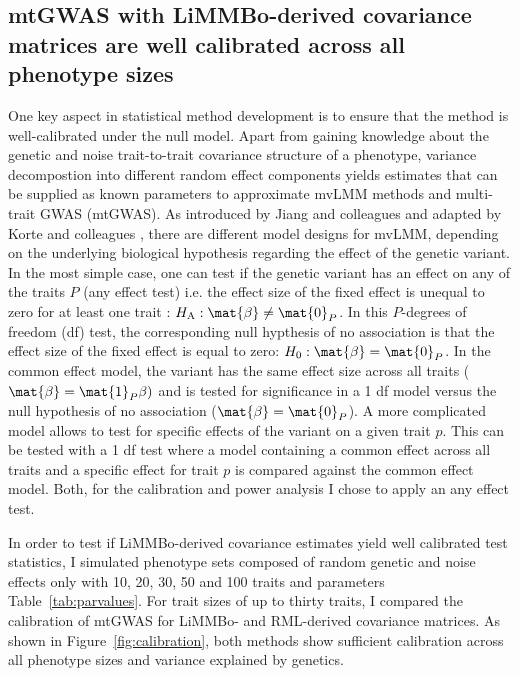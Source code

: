 \subsection{mtGWAS with LiMMBo-derived covariance matrices are well calibrated across all phenotype sizes}
One key aspect in statistical method development is to ensure that the method is well-calibrated under the null model. Apart from gaining knowledge about the genetic and noise trait-to-trait covariance structure of a phenotype, variance decompostion into different random effect components yields estimates that can be supplied as known parameters to approximate mvLMM methods and multi-trait GWAS (mtGWAS). As introduced by Jiang and colleagues \citeyear{Jiang1995} and adapted by Korte and colleagues \citeyear{Korte2012}, there are different model designs for mvLMM, depending on the underlying biological hypothesis regarding the effect of the genetic variant. In the most simple case, one can test if the genetic variant has an effect on any of the traits \(P\) (any effect test) i.e. the effect size of the fixed effect is unequal to zero for at least one trait : \(H_\text{A}: \mat{\beta} \ne \mat{0}_P\).  In this \(P\)-degrees of freedom (df) test, the corresponding null hypthesis of no association is that the effect size of the fixed effect is equal to zero: \(H_0:\mat{\beta}  = \mat{0}_P\). In the common effect model,  the variant has the same effect size across all traits (\(\mat{\beta}  = \mat{1}_P\beta)\) and is tested for significance in a 1 df model versus the null hypothesis of no association (\(\mat{\beta}  = \mat{0}_P\)). A more complicated model allows to test for specific effects of the variant on a given trait \(p\). This can be tested with a 1 df test where a model containing a common effect across all traits and a specific effect for trait \(p\) is compared against the common effect model. Both, for the calibration and power analysis I chose to apply an any effect test.

In order to test if LiMMBo-derived covariance estimates yield well calibrated test statistics, I simulated phenotype sets composed of random genetic and noise effects only with 10, 20, 30, 50 and 100 traits and parameters Table~\ref{tab:parvalues}. For trait sizes of up to thirty traits, I compared the calibration of mtGWAS for LiMMBo- and RML-derived covariance matrices. As shown in Figure~\ref{fig:calibration}, both methods show sufficient calibration across all phenotype sizes and variance explained by genetics. 

